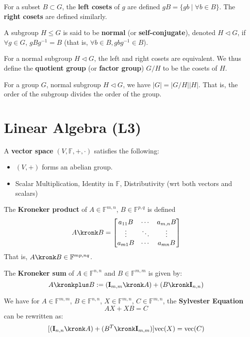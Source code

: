 \documentclass[9pt]{article}
\begin{document}
\begin{multicols}{2}
For a subset $B \subset G$, the \textbf{left cosets} of $g$ are  defined $gB=\{gb \mid \forall b \in B\}$. The \textbf{right cosets} are defined similarly.

A subgroup $H \le G$ is said to be \textbf{normal} (or \textbf{self-conjugate}), denoted $H \triangleleft G$, if $\forall g \in G$, $gBg^{-1} = B$ (that is, $\forall b \in B, gbg^{-1} \in B$).

For a normal subgroup $H \triangleleft G$, the left and right cosets are equivalent. We thus define the \textbf{quotient group} (or \textbf{factor group}) $G / H$ to be the cosets of $H$. 

\begin{theorem}
    For a group $G$, normal subgroup $H \triangleleft G$, we have
    $|G|=|G/H||H|$. That is, the order of the subgroup divides the
    order of the group.
\end{theorem}

\section{Linear Algebra (L3)}

A \textbf{vector space} $(V,\mathbb{F},+,\cdot)$ satisfies the following:
\begin{itemize}
  \setlength\itemsep{0em}
    \item $(V,+)$ forms an abelian group.
    \item Scalar Multiplication, Identity in $\mathbb{F}$, Distributivity (wrt both vectors and scalars)
\end{itemize}

The \textbf{Kroneker product} of $A \in \mathbb{F}^{m,n}$, $B \in \mathbb{F}^{p,q}$ is defined $$A \kronk B = \begin{bmatrix}
    a_{11}B & \cdots & a_{m,n}B \\
    \vdots & \ddots & \vdots \\
    a_{m1}B & \cdots & a_{mn}B
\end{bmatrix}$$
That is, $A \kronk B \in \mathbb{F}^{mp,nq}$. 

The \textbf{Kroneker sum} of $A \in \mathbb{F}^{n, n}$ and $B \in \mathbb{F}^{m,m}$ is given by: 
$$A \kronkplus B := (\mathbf{I}_{m,m} \kronk A) + (B \kronk \mathbf{I}_{n,n})$$

\begin{theorem}
   We have for $A \in \mathbb{F}^{m,m}$, $B \in \mathbb{F}^{n,n}$, 
   $X \in \mathbb{F}^{m,n}$, $C \in \mathbb{F}^{m,n}$, the \textbf{Sylvester Equation} $$AX+XB=C$$ can be rewritten as:
   $$[(\textbf{I}_{n,n}\kronk A)+ (B^T \kronk \mathbf{I}_{m,m})]\text{vec}(X)=\text{vec}(C)$$
\end{theorem}


\end{multicols}
\end{document}
